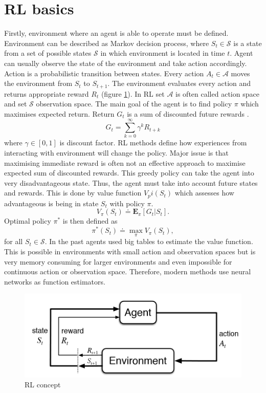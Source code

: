 \section{RL basics}
Firstly, environment where an agent is able to operate must be defined. Environment can be described as Markov decision process, where $S_t \in \mathcal{S}$ is a state from a set of possible states $\mathcal{S}$ in which environment is located in time $t$. Agent can usually observe the state of the environment and take action accordingly. Action is a probabilistic transition between states. Every action $A_t \in \mathcal{A}$ moves the environment from $S_t$ to $S_{t+1}$. The environment evaluates every action and returns appropriate reward $R_t$ (figure \ref{fig:rlconcept}). In RL set $\mathcal{A}$ is often called action space and set $\mathcal{S}$ observation space. The main goal of the agent is to find policy $\pi$ which maximises expected return. Return $G_t$ is a sum of discounted future rewards \cite{sutton2012}.
\begin{equation}
G_t = \sum\limits_{k=0}^{\infty}\gamma^k R_{t+k}
\end{equation}
where $\gamma \in [0,1]$ is discount factor. RL methods define how experiences from interacting with environment will change the policy.  Major issue is that maximising immediate reward is often not an effective approach to maximise expected sum of discounted rewards. This greedy policy can take the agent into very disadvantageous state. Thus, the agent must take into account future states and rewards. This is done by value function $V_pi(S_t)$ which assesses how advantageous is being in state $S_t$ with policy $\pi$.
\begin{equation}
V_\pi(S_t) \doteq  \mathbf{E}_\pi[G_t | S_t].
\end{equation}
Optimal policy $\pi^*$ is then defined as
\begin{equation}
\pi^*(S_t) \doteq \max\limits_\pi V_\pi(S_t),
\end{equation}
for all $S_t \in \mathcal{S}$.
In the past agents used big tables to estimate the value function. This is possible in environments with small action and observation spaces but is very memory consuming for larger environments and even impossible for continuous action or observation space. Therefore, modern methods use neural networks as function estimators.

\begin{figure}[!h]
\centering
\includegraphics[scale=0.3]{fig/RL-concept.png}
\caption{RL concept}
\label{fig:rlconcept}
\end{figure}
\pagebreak

